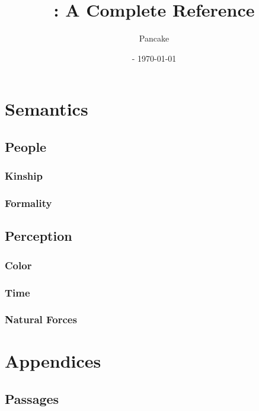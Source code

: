 \documentclass[openany, 12pt, b5paper]{memoir}
\begin{document}
\title{\langname : A Complete Reference}
\author{Pancake}
\date{ - \today}
\frontmatter
\begin{titlingpage}
  \maketitle
\end{titlingpage}

\begin{KeepFromToc}
  \tableofcontents
\end{KeepFromToc}
\mainmatter





\part{Semantics}
\chapter{People}
\section{Kinship}
\section{Formality}
\chapter{Perception}
\section{Color}
\section{Time}
\section{Natural Forces}

\part{Appendices}
\appendix

\chapter{Passages}
\backmatter
\end{document}
